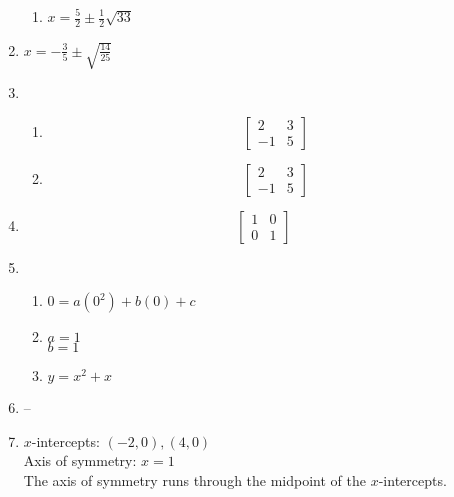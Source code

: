 \documentclass{article}
\begin{document}
\begin{enumerate}
\begin{enumerate}
	\item $x = \frac{5}{2} \pm \frac{1}{2} \sqrt{33}$
	
	\end{enumerate}
	
\item $x = -\frac{3}{5} \pm \sqrt{\frac{14}{25}}$

\item 

	\begin{enumerate}
	
	\item \begin{equation*}
		\begin{bmatrix}
		2 & 3 \\
		-1 & 5
		\end{bmatrix}
		\end{equation*}
		
	\item \begin{equation*}
		\begin{bmatrix}
		2 & 3 \\
		-1 & 5
		\end{bmatrix}
		\end{equation*}
		
	\end{enumerate}
	
\item \begin{equation*}
	\begin{bmatrix}
	1 & 0 \\
	0 & 1
	\end{bmatrix}
	\end{equation*}
	
\item

	\begin{enumerate}
	
	\item $0 = a(0^2) + b(0) + c$
	
	\item $a = 1$ \\
		$b = 1$
	
	\item $y = x^2 + x$
	
	\end{enumerate}
	
\item --
	
\item $x$-intercepts: $(-2, 0), (4, 0)$ \\
	Axis of symmetry: $x = 1$ \\
	The axis of symmetry runs through the midpoint of the $x$-intercepts.
	
\end{enumerate}
\end{document}
